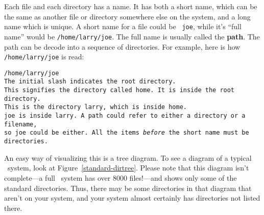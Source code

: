 Each file and each directory has a name.  It has both a short name, which
can be the same as another file or directory somewhere else on the system,
and a long name which is unique.  A short name for a file could be {\tt
joe}, while it's ``full name'' would be {\tt /home/larry/joe}. The full
name is usually called the {\bf path}.  The path can be
decode into a sequence of directories.  For example, here is how {\tt
/home/larry/joe} is read:
\begin{tabbing}
\tt /\=\tt home/\=\tt larry/\=\tt joe\\
The initial slash indicates the root directory.\+\\
This signifies the directory called {\tt home}. It is inside the
root directory.\+\\
This is the directory {\tt larry}, which is inside {\tt home}.\+\\
{\tt joe} is inside {\tt larry}.  A path could refer to either a
directory or a filename,\\ so {\tt joe} could be either.  All the items
{\em before\/} the short name must be directories.
\end{tabbing}

An easy way of visualizing this is a tree diagram.  To see a diagram
of a typical \linux\ system, look at Figure~\ref{standard-dirtree}.
Please note that this diagram isn't complete---a full \linux\ system
has over 8000 files!---and shows only some of the standard
directories.  Thus, there may be some directories in that diagram that
aren't on your system, and your system almost certainly has
directories not listed there.

